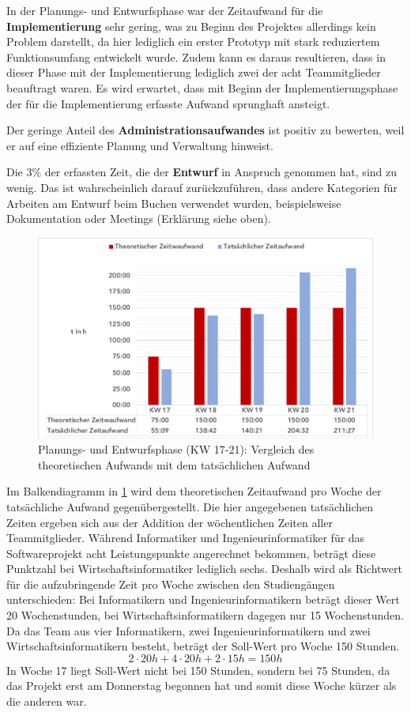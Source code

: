 \documentclass[../review_3.tex]{subfiles}
\begin{document}
In der Planungs- und Entwurfsphase war der Zeitaufwand für die \textbf{Implementierung} sehr gering, was zu Beginn des Projektes allerdings kein Problem darstellt, da hier lediglich ein erster Prototyp mit stark reduziertem Funktionsumfang entwickelt wurde. Zudem kann es daraus resultieren, dass in dieser Phase mit der Implementierung lediglich zwei der acht Teammitglieder beauftragt waren. Es wird erwartet, dass mit Beginn der Implementierungsphase  der für die Implementierung erfasste Aufwand sprunghaft ansteigt.

Der geringe Anteil des \textbf{Administrationsaufwandes} ist positiv zu bewerten, weil er auf eine effiziente Planung und Verwaltung hinweist.

Die 3\% der erfassten Zeit, die der \textbf{Entwurf} in Anspruch genommen hat, sind zu wenig. Das ist wahrscheinlich darauf zurückzuführen, dass andere Kategorien für Arbeiten am Entwurf beim Buchen verwendet wurden, beispielsweise Dokumentation oder Meetings (Erklärung siehe oben).

\begin{figure} [h]
    \centering
    \includegraphics[width = \linewidth]{img/Kimai2.pdf}
    \caption{Planungs- und Entwurfsphase (KW 17-21): Vergleich des theoretischen Aufwands mit dem tatsächlichen Aufwand}
    \label{sollist}
\end{figure}

Im Balkendiagramm in \ref{sollist} wird dem theoretischen Zeitaufwand pro Woche der tatsächliche Aufwand gegenübergestellt. Die hier angegebenen tatsächlichen Zeiten ergeben sich aus der Addition der wöchentlichen Zeiten aller Teammitglieder.
Während Informatiker und Ingenieurinformatiker für das Softwareprojekt acht Leistungspunkte angerechnet bekommen, beträgt diese Punktzahl bei Wirtschaftsinformatiker lediglich sechs. Deshalb wird als Richtwert für die aufzubringende Zeit pro Woche zwischen den Studiengängen unterschieden: Bei Informatikern und Ingenieurinformatikern beträgt dieser Wert 20 Wochenstunden, bei Wirtschaftsinformatikern dagegen nur 15 Wochenstunden.
Da das Team aus vier Informatikern, zwei Ingenieurinformatikern und zwei Wirtschaftsinformatikern besteht, beträgt der Soll-Wert pro Woche 150 Stunden.
\begin{equation*}
    2\cdot 20h + 4\cdot 20h + 2\cdot 15h = 150h
\end{equation*}
In Woche 17 liegt Soll-Wert nicht bei 150 Stunden, sondern bei 75 Stunden, da das Projekt erst am Donnerstag begonnen hat und somit diese Woche kürzer als die anderen war.
\end{document}
